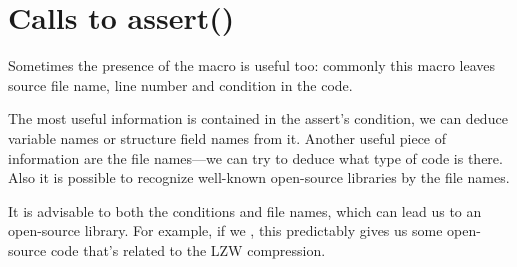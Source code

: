 \section{Calls to assert()}

Sometimes the presence of the  macro is useful too: 
commonly this macro leaves source file name, line number and condition in the code.

The most useful information is contained in the assert's condition, we can deduce variable names or structure field
names from it. Another useful piece of information are the file names---we can try to deduce what type of
code is there.
Also it is possible to recognize well-known open-source libraries by the file names.



It is advisable to  both the conditions and file names, which can lead us to an open-source library.
For example, if we  , this predictably 
gives us some open-source code that's related to the LZW compression.
